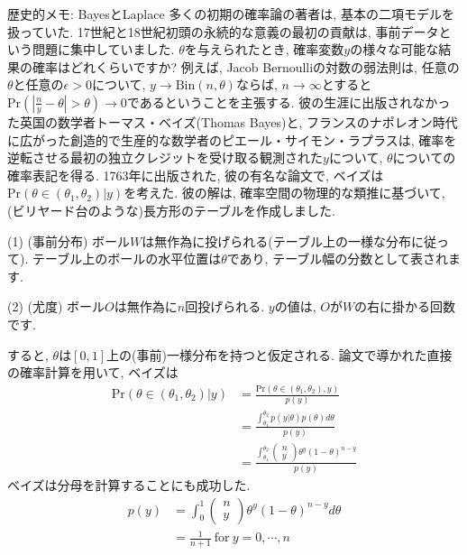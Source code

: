 \documentclass[10pt,dvipdfmx,a4]{beamer}
\newcommand{\eq}[1]{\begin{align}#1\end{align}}
\begin{document}
\begin{frame}{歴史的メモ: BayesとLaplace}
多くの初期の確率論の著者は, 基本の二項モデルを扱っていた.
17世紀と18世紀初頭の永続的な意義の最初の貢献は, 事前データという問題に集中していました.
$\theta$を与えられたとき, 確率変数$y$の様々な可能な結果の確率はどれくらいですか?
例えば, Jacob Bernoulliの対数の弱法則は, 任意の$\theta$と任意の$\epsilon>0$について, $y\rightarrow \text{Bin}(n,\theta)$ならば, $n\rightarrow\infty$とすると$\text{Pr}(|\tfrac{n}{y}-\theta|>\theta)\rightarrow 0$であるということを主張する.
彼の生涯に出版されなかった英国の数学者トーマス・ベイズ(Thomas Bayes)と, フランスのナポレオン時代に広がった創造的で生産的な数学者のピエール・サイモン・ラプラスは, 確率を逆転させる最初の独立クレジットを受け取る観測された$y$について, $\theta$についての確率表記を得る.
1763年に出版された, 彼の有名な論文で, ベイズは$\text{Pr}(\theta\in(\theta_1,\theta_2)|y)$を考えた.
彼の解は, 確率空間の物理的な類推に基づいて, (ビリヤード台のような)長方形のテーブルを作成しました.

(1) (事前分布) ボール$W$は無作為に投げられる(テーブル上の一様な分布に従って).
テーブル上のボールの水平位置は$\theta$であり, テーブル幅の分数として表されます.

(2) (尤度) ボール$O$は無作為に$n$回投げられる.
$y$の値は, $O$が$W$の右に掛かる回数です.
\end{frame}


\begin{frame}
すると, $\theta$は$[0,1]$上の(事前)一様分布を持つと仮定される.
論文で導かれた直接の確率計算を用いて, ベイズは
\eq{\text{Pr}(\theta\in(\theta_1,\theta_2)|y)&=\frac{\text{Pr}(\theta\in(\theta_1,\theta_2),y)}{p(y)}\nonumber\\
&=\frac{\int_{\theta_1}^{\theta_2}p(y|\theta)p(\theta)d\theta}{p(y)}\nonumber\\
&=\frac{\int_{\theta_1}^{\theta_2}\left(\begin{array}{c}n\\y\end{array}\right)\theta^y(1-\theta)^{n-y}}{p(y)}}
ベイズは分母を計算することにも成功した.
\eq{p(y)&=\int_0^1\left(\begin{array}{c}n\\y\end{array}\right)\theta^y(1-\theta)^{n-y}d\theta\nonumber\\
&=\frac{1}{n+1}\ \text{for}\ y=0,\cdots,n}
\end{frame}
\end{document}
